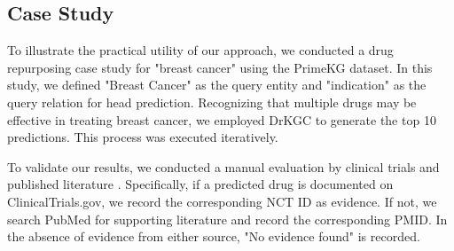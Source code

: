 \documentclass[11pt]{article}
\begin{document}
\subsection{Case Study}
To illustrate the practical utility of our approach, we conducted a drug repurposing case study for "breast cancer" using the PrimeKG dataset. In this study, we defined "Breast Cancer" as the query entity and "indication" as the query relation for head prediction. Recognizing that multiple drugs may be effective in treating breast cancer, we employed DrKGC to generate the top 10 predictions. This process was executed iteratively.

To validate our results, we conducted a manual evaluation by clinical trials and published literature \cite{zheng2021pharmkg,xiao2024fuselinker}. Specifically, if a predicted drug is documented on ClinicalTrials.gov, we record the corresponding NCT ID as evidence. If not, we search PubMed for supporting literature and record the corresponding PMID. In the absence of evidence from either source, "No evidence found" is recorded.

\begin{table}[h]
    \centering
    \caption{Top 10 predicted drugs for Breast Cancer.}
    \label{tab:predictBC}
\end{table}
\end{document}

